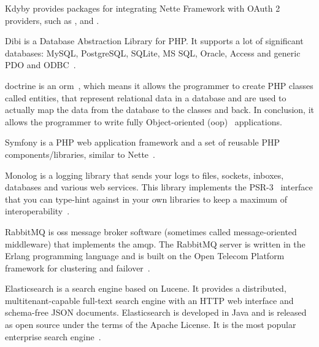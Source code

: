 Kdyby provides packages for integrating Nette Framework with OAuth 2 providers, such as ,  and .

 \label{sec:theory:dibi}

Dibi is a Database Abstraction Library for PHP. It supports a lot of significant databases: MySQL, PostgreSQL, SQLite, MS SQL, Oracle, Access and generic PDO and ODBC~\cite{dibi:homepage}.

 \label{sec:theory:doctrine}

\gls{doctrine} is an \gls{orm}~\cite{wiki:orm}, which means it allows the programmer to create PHP classes called entities, that represent relational data in a database and are used to actually map the data from the database to the classes and back. In conclusion, it allows the programmer to write fully Object-oriented (\acrshort{oop})~\cite{wiki:oop} applications.

 \label{sec:theory:symfony}

Symfony is a PHP web application framework and a set of reusable PHP components/libraries, similar to Nette~\cite{wiki:symfony}.

 \label{sec:theory:monolog}

Monolog is a logging library that sends your logs to files, sockets, inboxes, databases and various web services. This library implements the PSR-3~\cite{fig:psr} interface that you can type-hint against in your own libraries to keep a maximum of interoperability~\cite{monolog:readme}.

 \label{sec:theory:rabbitmq}

RabbitMQ is \gls{oss} message broker software (sometimes called message-oriented middleware) that implements the \gls{amqp}. The RabbitMQ server is written in the Erlang programming language and is built on the Open Telecom Platform framework for clustering and failover~\cite{wiki:rabbitmq}.

 \label{sec:theory:elasticsearch}

Elasticsearch is a search engine based on Lucene. It provides a distributed, multitenant-capable full-text search engine with an HTTP web interface and schema-free JSON documents. Elasticsearch is developed in Java and is released as open source under the terms of the Apache License. It is the most popular enterprise search engine~\cite{wiki:elasticsearch}.

